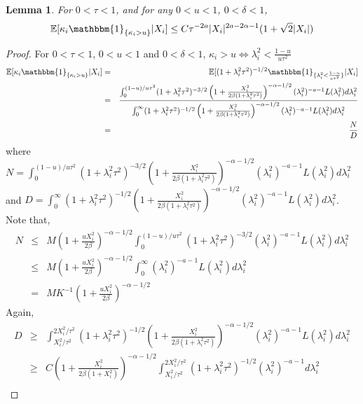 \documentclass[sn-basic]{sn-jnl}%
\theoremstyle{thmstyleone}%
\newtheorem{lemma}{Lemma}[section]%
\begin{document}
\begin{lemma}\label{lem:ig2}
For $0 < \tau < 1$, and for any $0<u<1$, $0<\delta<1$,
$$
\mathbb{E}[\kappa_i \mathbbm{1}_{\{ \kappa_i > u \}} | X_i] \leq C\tau^{-2a} |X_i|^{2a - 2\alpha - 1} (1+\sqrt{2}|X_i|)
$$
\end{lemma}

\begin{proof}
For $0 < \tau < 1$, $0<u<1$ and $0<\delta<1$, $\kappa_i > u \iff \lambda_i^2 < \frac{1-u}{u\tau^2}$
\begin{eqnarray}
\mathbb{E}[\kappa_i \mathbbm{1}_{\{ \kappa_i > u \}} | X_i]
&=&
\mathbb{E}[(1+\lambda_i^2 \tau^2)^{-1/2} \mathbbm{1}_{\{ \lambda_i^2 < \frac{1-u}{u\tau^2} \}} | X_i] \nonumber \\
&=&
\frac{\int_0^{(1-u)/u\tau^2} (1+\lambda_i^2\tau^2)^{-3/2} \left(1+\frac{X_i^2}{2\beta(1+\lambda_i^2\tau^2)} \right)^{-\alpha-1/2} (\lambda_i^2)^{-a-1} L(\lambda_i^2) d\lambda_i^2}{\int_0^\infty (1+\lambda_i^2\tau^2)^{-1/2} \left(1+\frac{X_i^2}{2\beta(1+\lambda_i^2\tau^2)} \right)^{-\alpha-1/2} (\lambda_i^2)^{-a-1} L(\lambda_i^2) d\lambda_i^2} \nonumber \\
&=&
\frac{N}{D}
\label{eq:l2-ig-1}
\end{eqnarray}
where $N = \int_0^{(1-u)/u\tau^2} (1+\lambda_i^2\tau^2)^{-3/2} \left(1+\frac{X_i^2}{2\beta(1+\lambda_i^2\tau^2)} \right)^{-\alpha-1/2} (\lambda_i^2)^{-a-1} L(\lambda_i^2) d\lambda_i^2$ and $D = \int_0^\infty (1+\lambda_i^2\tau^2)^{-1/2} \left(1+\frac{X_i^2}{2\beta(1+\lambda_i^2\tau^2)} \right)^{-\alpha-1/2} (\lambda_i^2)^{-a-1} L(\lambda_i^2) d\lambda_i^2$. Note that,
\begin{eqnarray}
N &\leq&
M \left( 1+\frac{uX_i^2}{2\beta} \right)^{-\alpha-1/2} \int_0^{(1-u)/u\tau^2} (1+\lambda_i^2\tau^2)^{-3/2} (\lambda_i^2)^{-a-1} L(\lambda_i^2) d\lambda_i^2 \nonumber \\
&\leq&
M \left( 1+\frac{uX_i^2}{2\beta} \right)^{-\alpha-1/2} \int_0^\infty (\lambda_i^2)^{-a-1} L(\lambda_i^2) d\lambda_i^2 \nonumber \\
&=&
M K^{-1} \left( 1+\frac{uX_i^2}{2\beta} \right)^{-\alpha-1/2}
\label{eq:l2-ig-2}
\end{eqnarray}
Again,
\begin{eqnarray}
D &\geq&
\int_{X_i^2/\tau^2}^{2X_i^2/\tau^2} (1+\lambda_i^2\tau^2)^{-1/2} \left(1+\frac{X_i^2}{2\beta(1+\lambda_i^2\tau^2)} \right)^{-\alpha-1/2} (\lambda_i^2)^{-a-1} L(\lambda_i^2) d\lambda_i^2 \nonumber \\
&\geq&
C \left(1+\frac{X_i^2}{2\beta(1+X_i^2)} \right)^{-\alpha-1/2} \int_{X_i^2/\tau^2}^{2X_i^2/\tau^2} (1+\lambda_i^2\tau^2)^{-1/2} (\lambda_i^2)^{-a-1} d\lambda_i^2 \nonumber \\

\end{eqnarray}
\end{proof}
\end{document}
